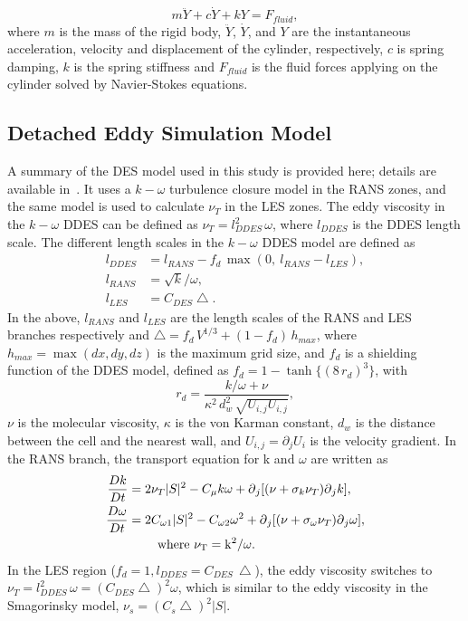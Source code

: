 \documentclass[12pt,authoryear]{elsarticle}
\begin{document}
\[
  m\ddot{Y}+c\dot{Y}+kY=F_{fluid},
\]
where $m$ is the mass of the rigid body, $\ddot{Y}$, $\dot{Y}$, and $Y$ are the
instantaneous acceleration, velocity and displacement of the cylinder,
respectively, $c$ is spring damping, $k$ is the spring stiffness and
$F_{fluid}$ is the fluid forces applying on the cylinder solved by
Navier-Stokes equations. 

\subsection{Detached Eddy Simulation Model}
\label{sec:DDES}
%
A summary of the DES model used in this study is provided here; details are
available in~\cite{yin2015dynamic}. It uses a $k-\omega$ turbulence closure
model in the RANS zones, and the same model is used to calculate $\nu_T$ in the
LES zones. The eddy viscosity in the $k-\omega$ DDES can be defined as
$\nu_T=l_{DDES}^2\, \omega$, where $l_{DDES}$ is the DDES length scale. The
different length scales in the $k-\omega$ DDES model are defined as
%
\begin{align*}  
  l_{DDES} &=l_{RANS}-f_d\, \max( 0,~l_{RANS}-l_{LES}), \\
  l_{RANS} &=\sqrt{k}/\omega,\\
  l_{LES} &=C_{DES}\bigtriangleup.
\end{align*}
%
In the above, $l_{RANS}$ and $l_{LES}$ are the length scales of the RANS and LES
branches respectively and $\bigtriangleup = f_d \,V^{1/3}+(1-f_d ) \,h_{max}$,
where $h_{max} = \max(dx,dy,dz)$ is the maximum grid size, and $f_d$ is a
shielding function of the DDES model, defined as $f_d = 1 -
\tanh\{(8\,r_d)^3\}$, with
\[
  r_d=\frac{k/\omega+\nu}{\kappa^2 \, d_w^2 \, \sqrt{U_{i,j} U_{i,j} }},
\]
$\nu$ is the molecular viscosity, $\kappa$ is the von Karman constant, $d_w$ is
the distance between the cell and the nearest wall, and $U_{i,j}=\partial_j
U_i$ is the velocity gradient.  In the RANS branch, the transport equation for
k and $\omega$ are written as
%
\begin{align*}  
  \frac{Dk}{Dt} & = 2\nu_T |S|^2-C_\mu k\omega+\partial{_j [(\nu+\sigma_k \nu_T ) \partial{_j k}]},\\
  \frac{D\omega}{Dt} & = 2C_{\omega1} |S|^2-C_{\omega2} \omega^2 
                    +\partial{_j [(\nu+\sigma_\omega \nu_T )\partial{_j \omega}]},\\
    &~~~~~~~\rm{where}~\nu_T=k^2/\omega.   
\end{align*}  
%
In the LES region ($f_d=1,l_{DDES}=C_{DES} \, \bigtriangleup$), the eddy viscosity
switches to $\nu_T=l_{DDES}^2\,\omega=(C_{DES}\bigtriangleup)^2\omega$, which is
similar to the eddy viscosity in the Smagorinsky model, $\nu_s=(C_s
\bigtriangleup)^2 |S|$.
\end{document}
